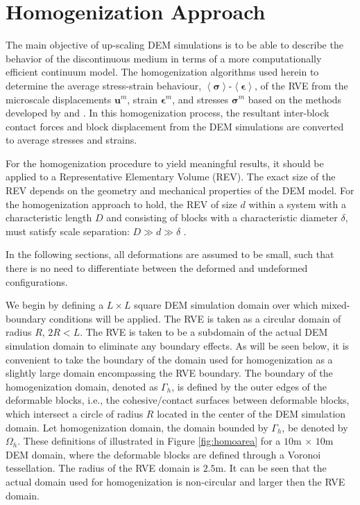 \section{Homogenization Approach}

The main objective of up-scaling DEM simulations is to be able to describe the  behavior of the discontinuous medium in terms of a more computationally efficient continuum model. The homogenization algorithms used herein to determine the average stress-strain behaviour, $\left<\boldsymbol{\sigma}\right>$-$\left<\boldsymbol{\epsilon}\right>$, of the RVE from the microscale displacements $\mathbf{u}^m$, strain $\boldsymbol{\epsilon}^m$, and stresses $\boldsymbol{\sigma}^m$ based on the methods developed by \citet{daddetta_particle_2004} and \citet{wellmann_homogenization_2008}. In this homogenization process, the resultant inter-block contact forces and block displacement from the DEM simulations are converted to average stresses and strains.

For the homogenization procedure to yield meaningful results, it should be applied to a Representative Elementary Volume (REV). The exact size of the REV depends on the geometry and mechanical properties of the DEM model. For the homogenization approach to hold, the REV of size $d$ within a system with a characteristic length $D$ and consisting of blocks with a characteristic diameter $\delta$, must satisfy scale separation: $D\gg d\gg\delta$ \citep{wellmann_homogenization_2008}. 

In the following sections, all deformations are assumed to be small, such that there is no need to differentiate between the deformed and undeformed configurations.  

We begin by defining a $L\times L$ square DEM simulation domain over which mixed-boundary conditions will be applied. The RVE is taken as a circular domain of radius $R$, $2R<L$.  The RVE is taken to be a subdomain of the actual DEM simulation domain to eliminate any boundary effects.  As will be seen below, it is convenient to take the boundary of the domain used for homogenization as a slightly large domain encompassing the RVE boundary. The boundary of the homogenization domain, denoted as $\Gamma_h$, is defined by the outer edges of the deformable blocks, i.e., the cohesive/contact surfaces between deformable blocks, which intersect a circle of radius $R$ located in the center of the DEM simulation domain. Let homogenization domain, the domain bounded by $\Gamma_h$, be denoted by $\Omega_h$. These definitions of illustrated in Figure \ref{fig:homoarea} for a $10$m $\times$ $10$m DEM domain, where the deformable blocks are defined through a Voronoi tessellation. The radius of the RVE domain is $2.5$m.  It can be seen that the actual domain used for homogenization is non-circular and larger then the RVE domain. 


